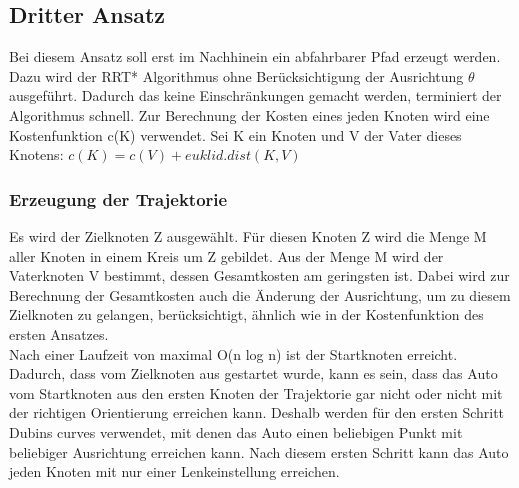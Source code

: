 \subsection{Dritter Ansatz}
Bei diesem Ansatz soll erst im Nachhinein ein abfahrbarer Pfad erzeugt werden. Dazu wird der RRT* Algorithmus ohne Berücksichtigung der Ausrichtung $\theta$ ausgeführt. Dadurch das keine Einschränkungen gemacht werden, terminiert der Algorithmus schnell. Zur Berechnung der Kosten eines jeden Knoten wird eine Kostenfunktion c(K) verwendet. Sei K ein Knoten und V der Vater dieses Knotens: 
$c(K) = c(V) + euklid. dist(K,V)$   \\
\subsubsection{Erzeugung der Trajektorie}
Es wird der Zielknoten Z ausgewählt. Für diesen Knoten Z wird die Menge M aller Knoten in einem Kreis um Z gebildet.  Aus der Menge M wird der Vaterknoten V bestimmt, dessen Gesamtkosten am geringsten ist. Dabei wird zur Berechnung der Gesamtkosten auch die Änderung der Ausrichtung, um zu diesem Zielknoten zu gelangen, berücksichtigt, ähnlich wie in der Kostenfunktion des ersten Ansatzes. \\
Nach einer Laufzeit von maximal O(n log n) ist der Startknoten erreicht. Dadurch, dass vom Zielknoten aus gestartet wurde, kann es sein, dass das Auto vom Startknoten aus den ersten Knoten der Trajektorie gar nicht oder nicht mit der richtigen Orientierung erreichen kann. Deshalb werden für den ersten Schritt Dubins curves verwendet, mit denen das Auto einen beliebigen Punkt mit beliebiger Ausrichtung erreichen kann. Nach diesem ersten Schritt kann das Auto jeden Knoten mit nur einer Lenkeinstellung erreichen. \\

